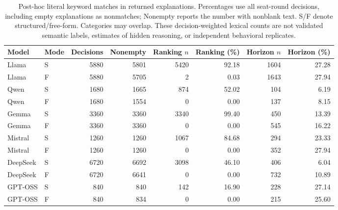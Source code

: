 \begin{table}[t]
\centering\small
\setlength{\tabcolsep}{3pt}
\begin{tabular}{llrrrrrr}
\toprule
Model & Mode & Decisions & Nonempty & Ranking $n$ & Ranking (\%) & Horizon $n$ & Horizon (\%) \\
\midrule
Llama & S & 5880 & 5801 & 5420 & 92.18 & 1604 & 27.28 \\
Llama & F & 5880 & 5705 & 2 & 0.03 & 1643 & 27.94 \\
Qwen & S & 1680 & 1665 & 874 & 52.02 & 104 & 6.19 \\
Qwen & F & 1680 & 1554 & 0 & 0.00 & 137 & 8.15 \\
Gemma & S & 3360 & 3360 & 3340 & 99.40 & 450 & 13.39 \\
Gemma & F & 3360 & 3360 & 0 & 0.00 & 545 & 16.22 \\
Mistral & S & 1260 & 1260 & 1067 & 84.68 & 294 & 23.33 \\
Mistral & F & 1260 & 1260 & 0 & 0.00 & 352 & 27.94 \\
DeepSeek & S & 6720 & 6692 & 3098 & 46.10 & 406 & 6.04 \\
DeepSeek & F & 6720 & 6641 & 0 & 0.00 & 732 & 10.89 \\
GPT-OSS & S & 840 & 840 & 142 & 16.90 & 228 & 27.14 \\
GPT-OSS & F & 840 & 834 & 0 & 0.00 & 215 & 25.60 \\
\bottomrule
\end{tabular}
\caption{Post-hoc literal keyword matches in returned explanations. Percentages use all seat-round decisions, including empty explanations as nonmatches; Nonempty reports the number with nonblank text. S/F denote structured/free-form. Categories may overlap. These decision-weighted lexical counts are not validated semantic labels, estimates of hidden reasoning, or independent behavioral replicates.}
\label{tab:log-keywords}
\end{table}
